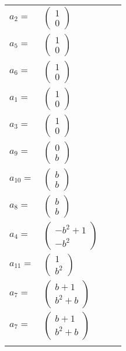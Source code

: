 \documentclass[1p]{elsarticle_modified}
\theoremstyle{definition}
\begin{document}
\begin{tabular}{m{7pt} m{180pt} m{7pt} m{180pt} }
\flushright $a_{2}=$&$\begin{pmatrix}1\\0\end{pmatrix}$ \\
\flushright $a_{5}=$&$\begin{pmatrix}1\\0\end{pmatrix}$ \\
\flushright $a_{6}=$&$\begin{pmatrix}1\\0\end{pmatrix}$ \\
\flushright $a_{1}=$&$\begin{pmatrix}1\\0\end{pmatrix}$ \\
\flushright $a_{3}=$&$\begin{pmatrix}1\\0\end{pmatrix}$ \\
\flushright $a_{9}=$&$\begin{pmatrix}0\\b\end{pmatrix}$ \\
\flushright $a_{10}=$&$\begin{pmatrix}b\\b\end{pmatrix}$ \\
\flushright $a_{8}=$&$\begin{pmatrix}b\\b\end{pmatrix}$ \\
\flushright $a_{4}=$&$\begin{pmatrix}- b^2+1\\- b^2\end{pmatrix}$ \\
\flushright $a_{11}=$&$\begin{pmatrix}1\\b^2\end{pmatrix}$ \\
\flushright $a_{7}=$&$\begin{pmatrix}b+1\\b^2+b\end{pmatrix}$\\ \flushright $a_{7}=$&$\begin{pmatrix}b+1\\b^2+b\end{pmatrix}$\\&\end{tabular}
\end{document}
